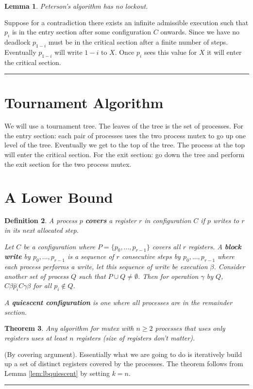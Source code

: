 \documentclass[twoside]{article}
\newcounter{lecnum}
\newtheorem{theorem}{Theorem}[lecnum]
\newtheorem{lemma}[theorem]{Lemma}
\newtheorem{definition}[theorem]{Definition}
\newenvironment{proof}{{\bf Proof:}}{\hfill\rule{2mm}{2mm}}
\begin{document}
\begin{lemma}
Peterson's algorithm has no lockout.
\end{lemma}
\begin{proof}
Suppose for a contradiction there exists an infinite admissible execution such that $p_i$ is in the entry section after some configuration $C$ onwards. Since we have no deadlock $p_{1-i}$ must be in the critical section after a finite number of steps. Eventually $p_{1-i}$ will write $1-i$ to $X$. Once $p_i$ sees this value for $X$ it will enter the critical section.   
\end{proof}

\section{Tournament Algorithm}
We will use a tournament tree. The leaves of the tree is the set of processes. For the entry section: each pair of processes uses the two process mutex to go up one level of the tree. Eventually we get to the top of the tree. The process at the top will enter the critical section. For the exit section: go down the tree and perform the exit section for the two process mutex. 

\section{A Lower Bound}
\begin{definition}
A process $p$ \textbf{covers} a register $r$ in configuration $C$ if $p$ writes to $r$ in its next allocated step. 

Let $C$ be a configuration where $P = \{p_0, ..., p_{r-1}\}$ covers all $r$ registers. A \textbf{block write} by $p_0, ..., p_{r-1}$ is a sequence of $r$ consecutive steps by $p_0, ..., p_{r-1}$ where each process performs a write, let this sequence of write be execution $\beta$. Consider another set of process $Q$ such that $P \cup Q \neq \emptyset$. Then for operation $\gamma$ by $Q$, $C\beta \stackrel{\sim}{p_i} C\gamma\beta$ for all $p_i \notin Q$. 

A \textbf{quiescent configuration} is one where all processes are in the remainder section.
\end{definition}

\begin{theorem}
Any algorithm for mutex with $n \geq 2$ processes that uses only registers uses at least $n$ registers (size of registers don't matter).
\end{theorem}
\begin{proof}
(By covering argument). Essentially what we are going to do is iteratively build up a set of distinct registers covered by the processes. The theorem follows from Lemma \ref{lem:lbquiescent} by setting $k = n$.   
\end{proof}
\end{document}
